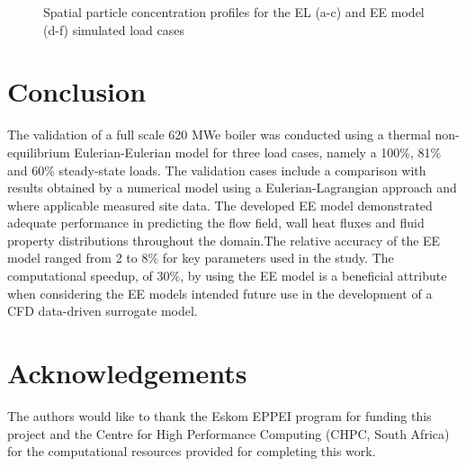 \documentclass{webofc}
\begin{document}
\begin{figure}[h!]
\setlength{\belowcaptionskip}{0pt} 
\caption{Spatial particle concentration profiles for the EL (a-c) and EE model (d-f) simulated load cases}
\label{fig_concentration}
\end{figure}

\clearpage
\section{Conclusion}
The validation of a full scale 620 MWe boiler was conducted using a thermal non-equilibrium Eulerian-Eulerian model for three load cases, namely a 100\%, 81\% and 60\% steady-state loads. The validation cases include a comparison with results obtained by a numerical model using a Eulerian-Lagrangian approach and where applicable measured site data. The developed EE model demonstrated adequate performance in predicting the flow field, wall heat fluxes and fluid property distributions throughout the domain.The relative accuracy of the EE model ranged from 2 to 8\% for key parameters used in the study. The computational speedup, of 30\%, by using the EE model is a beneficial attribute when considering the EE models intended future use in the development of a CFD data-driven surrogate model. 

\section*{Acknowledgements}
The authors would like to thank the Eskom EPPEI program for funding this project and the Centre for High Performance Computing (CHPC, South Africa) for the computational resources provided for completing this work.

%
% 
%
%
\end{document}

